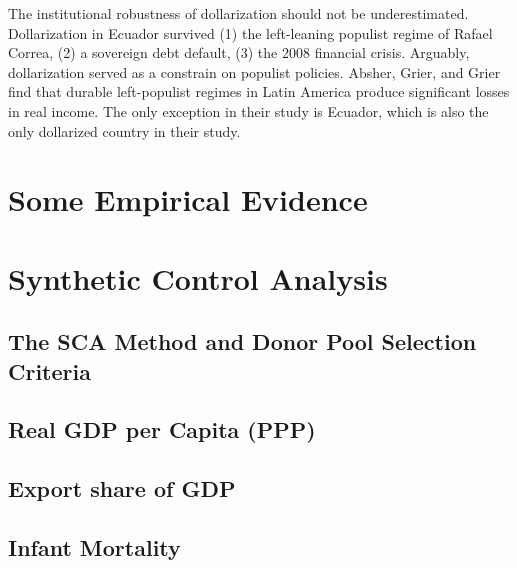 \documentclass[12pt]{article}
\begin{document}
The institutional robustness of dollarization should not be underestimated. Dollarization in Ecuador survived (1) the left-leaning populist regime of Rafael Correa, (2) a sovereign debt default, (3) the 2008 financial crisis. Arguably, dollarization served as a constrain on populist policies. Absher, Grier, and Grier \parencite*{Absher2020} find that durable left-populist regimes in Latin America produce significant losses in real income. The only exception in their study is Ecuador, which is also the only dollarized country in their study.

\section{Some Empirical Evidence}

\section{Synthetic Control Analysis}

\subsection{The SCA Method and Donor Pool Selection Criteria}

\subsection{Real GDP per Capita (PPP)}

\subsection{Export share of GDP}

\subsection{Infant Mortality}





\newpage
\singlespacing
\printbibliography

\end{document}
